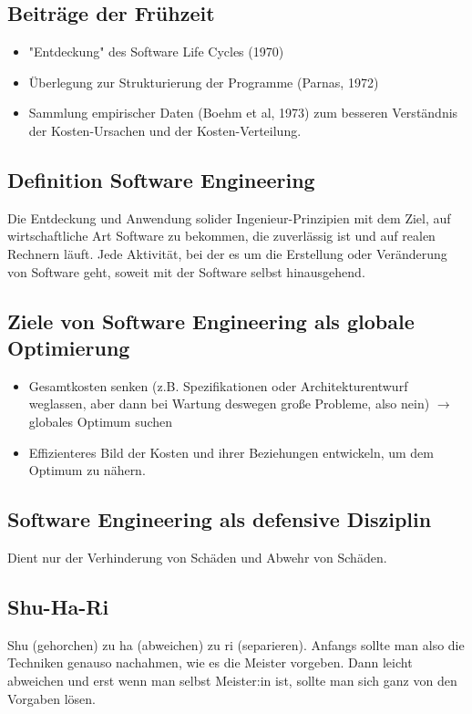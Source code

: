\documentclass{book}
\begin{document}
    \subsection{Beiträge der Frühzeit}
    \begin{itemize}
        \item "Entdeckung" des Software Life Cycles (1970)
        \item Überlegung zur Strukturierung der Programme (Parnas, 1972)
        \item Sammlung empirischer Daten (Boehm et al, 1973) zum besseren Verständnis der Kosten-Ursachen und der Kosten-Verteilung.
    \end{itemize}

    \subsection{Definition Software Engineering}
    Die Entdeckung und Anwendung solider Ingenieur-Prinzipien mit dem Ziel, auf wirtschaftliche Art Software zu bekommen, die zuverlässig ist und auf realen Rechnern läuft.
    Jede Aktivität, bei der es um die Erstellung oder Veränderung von Software geht, soweit mit der Software selbst hinausgehend.

    \subsection{Ziele von Software Engineering als globale Optimierung}
    \begin{itemize}
        \item Gesamtkosten senken (z.B. Spezifikationen oder Architekturentwurf weglassen, aber dann bei Wartung deswegen große Probleme, also nein) $\rightarrow$ globales Optimum suchen
        \item Effizienteres Bild der Kosten und ihrer Beziehungen entwickeln, um dem Optimum zu nähern.
    \end{itemize}
    \subsection{Software Engineering als defensive Disziplin}
    Dient nur der Verhinderung von Schäden und Abwehr von Schäden.
    \subsection{Shu-Ha-Ri}
    Shu (gehorchen) zu ha (abweichen) zu ri (separieren). Anfangs sollte man also die Techniken genauso nachahmen, wie es die Meister vorgeben. Dann leicht abweichen und erst wenn man selbst Meister:in ist, sollte man sich ganz von den Vorgaben lösen.
\end{document}

